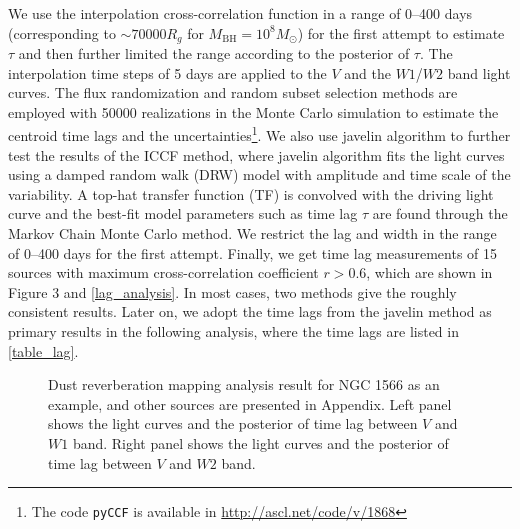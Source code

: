 \documentclass[linenumbers]{aastex631}
\begin{document}
We use the interpolation cross-correlation function \citep[ICCF;][]{1998PASP..110..660P,2018ascl.soft05032S} in a range of 0--400 days (corresponding to $\sim 70000 R_g$ for $M_\mathrm{BH}=10^8 M_{\odot}$) for the first attempt to estimate $\tau$ and then further limited the range according to the posterior of $\tau$. The interpolation time steps of 5 days are applied to the $V$ and the $W1$/$W2$ band light curves. The flux randomization and random subset selection methods are employed with 50000 realizations in the Monte Carlo simulation to estimate the centroid time lags and the uncertainties\footnote{The code \texttt{pyCCF} is available in \url{http://ascl.net/code/v/1868}}. We also use {\sc javelin} algorithm to further test the results of the ICCF method, where {\sc javelin} algorithm fits the light curves using a damped random walk (DRW) model with amplitude and time scale of the variability. A top-hat transfer function (TF) is convolved with the driving light curve and the best-fit model parameters such as time lag $\tau$ are found through the Markov Chain Monte Carlo method. We restrict the lag and width in the range of 0--400 days for the first attempt. Finally,  we get time lag measurements of 15 sources with maximum cross-correlation coefficient $r>0.6$, which are shown in Figure 3 and \autoref{lag_analysis}. In most cases, two methods give the roughly consistent results. Later on, we adopt the time lags from the {\sc javelin} method as primary results in the following analysis, where the time lags are listed in \autoref{table_lag}. 

\begin{figure}[b]\label{fig:lag_NGC1566}
\caption{Dust reverberation mapping analysis result for NGC 1566 as an example, and other sources are presented in Appendix. Left panel shows the light curves and the posterior of time lag between $V$ and $W1$ band. Right panel shows the light curves and the posterior of time lag between $V$ and $W2$ band.}
\end{figure}
\end{document}
